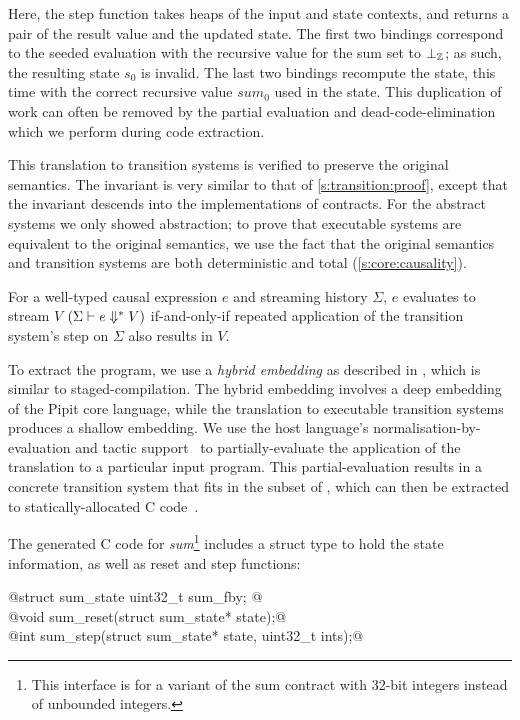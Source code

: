 Here, the step function takes heaps of the input and state contexts, and returns a pair of the result value and the updated state.
The first two bindings correspond to the seeded evaluation with the recursive value for the sum set to $\bot_{\mathbb{Z}}$; as such, the resulting state $s_0$ is invalid.
The last two bindings recompute the state, this time with the correct recursive value $\textit{sum}_0$ used in the state.
This duplication of work can often be removed by the partial evaluation and dead-code-elimination which we perform during code extraction.

This translation to transition systems is verified to preserve the original semantics.
The invariant is very similar to that of \autoref{s:transition:proof}, except that the invariant descends into the implementations of contracts.
For the abstract systems we only showed abstraction; to prove that executable systems are equivalent to the original semantics, we use the fact that the original semantics and transition systems are both deterministic and total (\autoref{s:core:causality}).

\begin{theorem}
  For a well-typed causal expression $e$ and streaming history $\Sigma$, $e$ evaluates to stream $V$ $(\Sigma \vdash e \Downarrow^{*} V)$ if-and-only-if repeated application of the transition system's step on $\Sigma$ also results in $V$.
\end{theorem}

To extract the program, we use a \emph{hybrid embedding} as described in \cite{ho2022noise}, which is similar to staged-compilation.
The hybrid embedding involves a deep embedding of the Pipit core language, while the translation to executable transition systems produces a shallow embedding.
We use the \fstar{} host language's normalisation-by-evaluation and tactic support~\cite{martinez2019meta} to partially-evaluate the application of the translation to a particular input program.
This partial-evaluation results in a concrete transition system that fits in the \lowstar{} subset of \fstar{}, which can then be extracted to statically-allocated C code~\cite{protzenko2017verified}.

The generated C code for \emph{sum}\footnote{This interface is for a variant of the sum contract with 32-bit integers instead of unbounded integers.} includes a struct type to hold the state information, as well as reset and step functions:
  \begin{tabbing}
    @struct sum_state { uint32_t sum_fby; }@ \\
    @void   sum_reset(struct sum_state* state);@ \\
    @int    sum_step(struct sum_state* state, uint32_t ints);@
  \end{tabbing}


